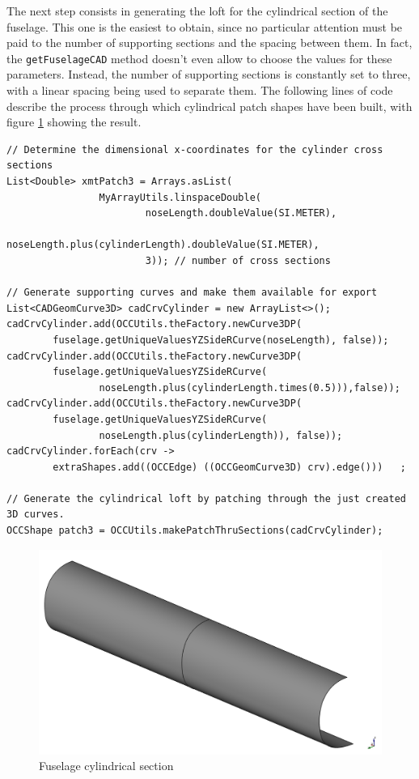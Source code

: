 \bigskip
\noindent
The next step consists in generating the loft for the cylindrical section of the fuselage. This one is the easiest to obtain, since no particular attention must be paid to the number of supporting sections and the spacing between them. In fact, the \lstinline[language=Java]!getFuselageCAD! method doesn't even allow to choose the values for these parameters. Instead, the number of supporting sections is constantly set to three, with a linear spacing being used to separate them. The following lines of code describe the process through which cylindrical patch shapes have been built, with figure \ref{fig:FusCylinder} showing the result.
%
\bigskip
\begin{lstlisting}[caption={Fuselage cylinder building steps}, captionpos=b, tabsize=2, label={lst:FusCylinderCreation}]
// Determine the dimensional x-coordinates for the cylinder cross sections
List<Double> xmtPatch3 = Arrays.asList(
				MyArrayUtils.linspaceDouble(
						noseLength.doubleValue(SI.METER), 
						noseLength.plus(cylinderLength).doubleValue(SI.METER), 
						3)); // number of cross sections

// Generate supporting curves and make them available for export
List<CADGeomCurve3D> cadCrvCylinder = new ArrayList<>();
cadCrvCylinder.add(OCCUtils.theFactory.newCurve3DP(
		fuselage.getUniqueValuesYZSideRCurve(noseLength), false));				
cadCrvCylinder.add(OCCUtils.theFactory.newCurve3DP(
		fuselage.getUniqueValuesYZSideRCurve(
				noseLength.plus(cylinderLength.times(0.5))),false));				
cadCrvCylinder.add(OCCUtils.theFactory.newCurve3DP(
		fuselage.getUniqueValuesYZSideRCurve(
				noseLength.plus(cylinderLength)), false));
cadCrvCylinder.forEach(crv -> 
		extraShapes.add((OCCEdge) ((OCCGeomCurve3D) crv).edge()))	;				

// Generate the cylindrical loft by patching through the just created 3D curves.						
OCCShape patch3 = OCCUtils.makePatchThruSections(cadCrvCylinder);
\end{lstlisting}
%
\begin{figure}[H]
\centering
\includegraphics[scale=0.30]{Immagini/Capitolo3/FusCylinderPlusSupCurves}
\caption{Fuselage cylindrical section}
\label{fig:FusCylinder}
\end{figure}
%


